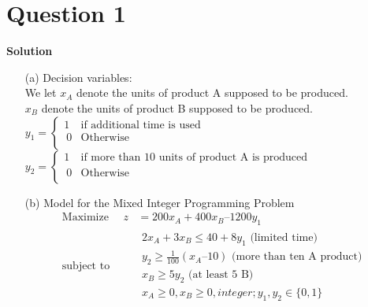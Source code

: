 \documentclass[12pt,a4paper]{article}
\begin{document}
\section*{Question 1}
\textbf{Solution}
\begin{enumerate}
    \item[(a)] Decision variables:\\
        We let $x_A$ denote the units of product A supposed to be produced.\\
        $x_B$ denote the units of product B supposed to be produced.\\
        $
            y_1 = \begin{cases}
                1               & \text{if additional time is used} \\\
                0               & \text{Otherwise} \\
            \end{cases}
        $\\
        $
            y_2 = \begin{cases}
                1               & \text{if more than 10 units of product A is produced} \\\
                0               & \text{Otherwise} \\
            \end{cases}
        $
     \item[(b)] Model for the Mixed Integer Programming Problem\\
        \begin{equation}
            \begin{aligned}
            \text{Maximize } \quad    z &=  200x_A + 400x_B – 1200y_1\\
            \text{subject to }\quad &
                \begin{array}{c}
                     2x_A + 3x_B    \leq  40 + 8y_1 \text{ (limited time)}\\
                     y_2 \geq \frac{1}{100} (x_A – 10)  \text{ (more than ten A product)}\\
                     x_B \geq 5y_2  \text{ (at least 5 B)}\\
                     x_A \geq 0, x_B \geq 0, integer; y_1, y_2 \in \{0,1\}

                \end{array}
            \end{aligned}
            \label{eq:problem_2}
        \end{equation}
\end{enumerate}
\end{document}
